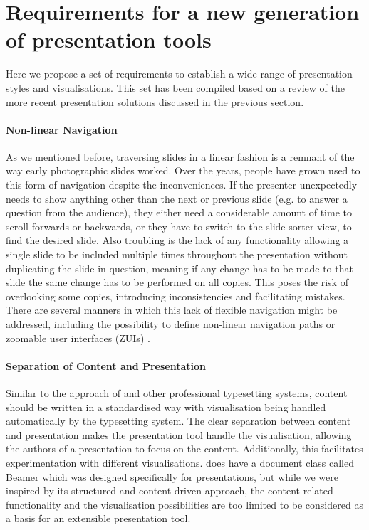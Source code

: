   \section{Requirements for a new generation of presentation tools}

   Here we propose a set of requirements to establish a wide range of
   presentation styles and visualisations. This set has been compiled based on
   a review of the more recent presentation solutions discussed in the previous
   section.

     \paragraph{Non-linear Navigation}
     
      As we mentioned before, traversing slides in a linear fashion is a
      remnant of the way early photographic slides worked. Over the years,
      people have grown used to this form of navigation despite the
      inconveniences. If the presenter unexpectedly needs to show anything
      other than the next or previous slide (e.g. to answer a question from the
      audience), they either need a considerable amount of time to scroll
      forwards or backwards, or they have to switch to the slide sorter view,
      to find the desired slide. Also troubling is the lack of any
      functionality allowing a single slide to be included multiple times
      throughout the presentation without duplicating the slide in question,
      meaning if any change has to be made to that slide the same change has to
      be performed on all copies. This poses the risk of overlooking some
      copies, introducing inconsistencies and facilitating mistakes. There are
      several manners in which this lack of flexible navigation might be
      addressed, including the possibility to define non-linear navigation
      paths \citep{spicer-1,edge-1} or zoomable user interfaces (ZUIs)
      \citep{good-1,lichtschlag-1,haller-1}.

     \paragraph{Separation of Content and Presentation}
     
      Similar to the approach of \latex and other professional typesetting
      systems, content should be written in a standardised way with
      visualisation being handled automatically by the typesetting system. The
      clear separation between content and presentation makes the presentation
      tool handle the visualisation, allowing the authors of a presentation to
      focus on the content. Additionally, this facilitates experimentation with
      different visualisations. \latex does have a document class called Beamer
      which was designed specifically for presentations, but while we were
      inspired by its structured and content-driven approach, the
      content-related functionality and the visualisation possibilities are too
      limited to be considered as a basis for an extensible presentation tool.

